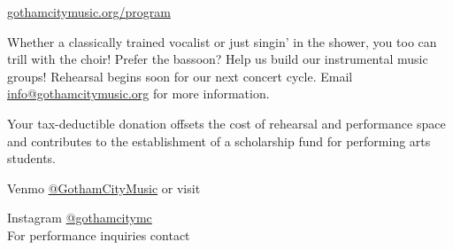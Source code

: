 \documentclass{article}[10pt]
\begin{document}
\begin{center}
\begin{minipage}{4in}
\begin{center}
                \href{https://gothamcitymusic.org/program}{gothamcitymusic.org/program}
            \end{center}

            \begin{center}
            {\textbf{}}
            \end{center}

            \vspace{-0.1in}

            \begin{small}
                Whether a classically trained vocalist or just singin' in the shower,
                you too can trill with the choir!
                Prefer the bassoon?
                Help us build our instrumental music groups!
                Rehearsal begins soon for our next concert cycle.
                Email \href{info@gothamcitymusic.org}{info@gothamcitymusic.org} for more information.
            \end{small}

            \begin{center}
            {\textbf{}}
            \end{center}

            \vspace{-0.1in}

            \begin{small}
                Your tax-deductible donation offsets the cost of rehearsal and performance space and contributes to the establishment of a scholarship fund for performing arts students.\\
            \end{small}

            Venmo \href{https://account.venmo.com/u/GothamCityMusic}{@GothamCityMusic} or visit \textbf{}

            \begin{center}
            {\textbf{}}

                \faInstagram{}{}  Instagram  \href{https://www.instagram.com/gothamcitymc/}{@gothamcitymc}\\
                For performance inquiries contact
                    {\textbf{}}
            \end{center}


\end{minipage}
\end{center}
\end{document}
